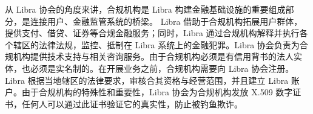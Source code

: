 从 Libra 协会的角度来讲，合规机构是 Libra 构建金融基础设施的重要组成部分，是连接用户、金融监管系统的桥梁。 Libra 借助于合规机构拓展用户群体，提供支付、借贷、证券等合规金融服务；同时，Libra 通过合规机构解释并执行各个辖区的法律法规，监控、抵制在 Libra 系统上的金融犯罪。Libra 协会负责为合规机构提供技术支持与相关咨询服务。由于合规机构必须是有信用背书的法人实体，也必须是实名制的。在开展业务之前，合规机构需要向 Libra 协会注册。Libra 根据当地辖区的法律要求，审核合其资格与经营范围，并且建立 Libra 账户。由于合规机构的特殊性和重要性，Libra 协会为合规机构发放 X.509 数字证书，任何人可以通过此证书验证它的真实性，防止被钓鱼欺诈。





